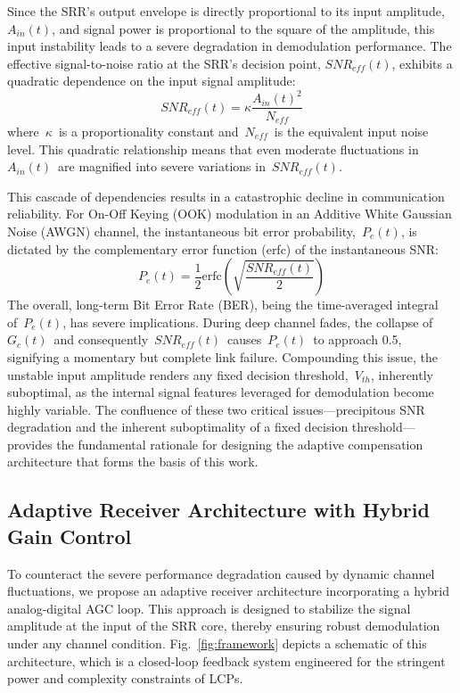 \documentclass[journal]{IEEEtran}
\begin{document}
Since the SRR's output envelope is directly proportional to its input amplitude, $A_{in}(t)$, and signal power is proportional to the square of the amplitude, this input instability leads to a severe degradation in demodulation performance. The effective signal-to-noise ratio at the SRR's decision point, $SNR_{eff}(t)$, exhibits a quadratic dependence on the input signal amplitude:
\begin{equation}
    SNR_{eff}(t) = \kappa \frac{A_{in}(t)^2}{N_{eff}}
    \label{eq:snr_squared}
\end{equation}
where~$\kappa$~is a proportionality constant and~$N_{eff}$~is the equivalent input noise level. This quadratic relationship means that even moderate fluctuations in~$A_{in}(t)$~are magnified into severe variations in~$SNR_{eff}(t)$.

This cascade of dependencies results in a catastrophic decline in communication reliability. For On-Off Keying (OOK) modulation in an Additive White Gaussian Noise (AWGN) channel, the instantaneous bit error probability,~$P_e(t)$, is dictated by the complementary error function (erfc) of the instantaneous SNR:
\begin{equation}
    P_e(t) = \frac{1}{2}\text{erfc}\left(\sqrt{\frac{SNR_{eff}(t)}{2}}\right)
    \label{eq:Pe_t_revised}
\end{equation}
The overall, long-term Bit Error Rate (BER), being the time-averaged integral of~$P_e(t)$, has severe implications. During deep channel fades, the collapse of~$G_c(t)$~and consequently~$SNR_{eff}(t)$~causes~$P_e(t)$~to approach 0.5, signifying a momentary but complete link failure. Compounding this issue, the unstable input amplitude renders any fixed decision threshold,~$V_{th}$, inherently suboptimal, as the internal signal features leveraged for demodulation become highly variable. The confluence of these two critical issues---precipitous SNR degradation and the inherent suboptimality of a fixed decision threshold---provides the fundamental rationale for designing the adaptive compensation architecture that forms the basis of this work.

\subsection{Adaptive Receiver Architecture with Hybrid Gain Control}
\label{subsec:adaptive_architecture}
To counteract the severe performance degradation caused by dynamic channel fluctuations, we propose an adaptive receiver architecture incorporating a hybrid analog-digital AGC loop. This approach is designed to stabilize the signal amplitude at the input of the SRR core, thereby ensuring robust demodulation under any channel condition. Fig.~\ref{fig:framework} depicts a schematic of this architecture, which is a closed-loop feedback system engineered for the stringent power and complexity constraints of LCPs.
\end{document}

